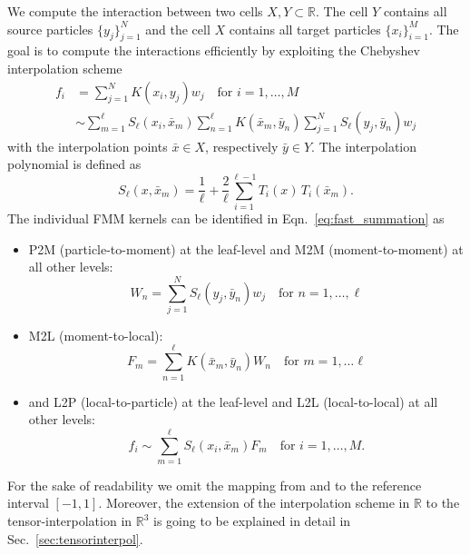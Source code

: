 \documentclass[]{article}
\theoremstyle{plain}
\begin{document}
We compute the interaction between two cells $X,Y\subset\mathbb{R}$. The cell
$Y$ contains all source particles $\{y_j\}_{j=1}^N$ and the cell $X$ contains
all target particles $\{x_i\}_{i=1}^M$. The goal is to compute the
interactions efficiently by exploiting the Chebyshev interpolation scheme
\begin{align}
  \label{eq:fast_summation}
  f_i &= \sum_{j=1}^N K(x_i,y_j)w_j \quad \text{for } i=1,\dots,M \nonumber \\
  &\sim \sum_{m=1}^\ell S_\ell(x_i,\bar x_m) \sum_{n=1}^\ell K(\bar
  x_m, \bar y_n) \sum_{j=1}^N S_\ell(y_j,\bar y_n) w_j
\end{align}
with the interpolation points $\bar x\in X$, respectively $\bar y\in Y$. The
interpolation polynomial is defined as
\begin{equation}
  \label{eq:interpolation_polynomial}
  S_\ell(x, \bar x_m) = \frac{1}{\ell} + \frac{2}{\ell} \sum_{i=1}^{\ell-1}
   T_i(x) \, T_i(\bar x_m).
\end{equation}
The individual FMM kernels can be identified in Eqn.~\eqref{eq:fast_summation}
as
\begin{itemize}
\item P2M (particle-to-moment) at the leaf-level and M2M (moment-to-moment) at
  all other levels:
  \begin{equation}
    \label{eq:m2m}
    W_n = \sum_{j=1}^{N} S_\ell(y_j,\bar y_n) w_j \quad \text{for }
    n=1,\dots,\ell
  \end{equation}
\item M2L (moment-to-local):
  \begin{equation}
    \label{eq:m2l}
    F_m = \sum_{n=1}^\ell K(\bar x_m, \bar y_n) W_n \quad \text{for }
    m=1,\dots\ell
  \end{equation}
\item and L2P (local-to-particle) at the leaf-level and L2L (local-to-local)
  at all other levels:
  \begin{equation}
    \label{eq:l2l}
    f_i \sim \sum_{m=1}^\ell S_\ell(x_i,\bar x_m) F_m \quad \text{for }
    i=1,\dots,M.
  \end{equation}
\end{itemize}
For the sake of readability we omit the mapping from and to the reference
interval $[-1,1]$. Moreover, the extension of the interpolation scheme in
$\mathbb{R}$ to the tensor-interpolation in $\mathbb{R}^3$ is going to be
explained in detail in Sec.~\ref{sec:tensorinterpol}.
\end{document}
